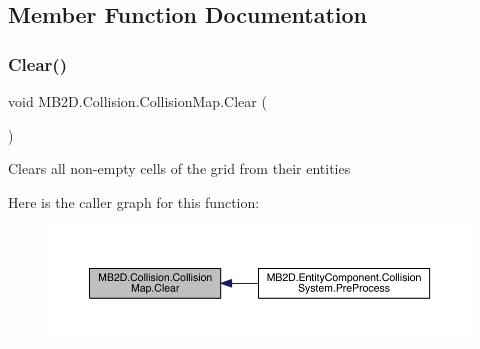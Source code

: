 \subsection{Member Function Documentation}
\hypertarget{class_m_b2_d_1_1_collision_1_1_collision_map_ac7eeef6db2deadf738ea40ff939759ff}{}\label{class_m_b2_d_1_1_collision_1_1_collision_map_ac7eeef6db2deadf738ea40ff939759ff} 
\subsubsection{\texorpdfstring{Clear()}{Clear()}}
{\footnotesize\ttfamily void M\+B2\+D.\+Collision.\+Collision\+Map.\+Clear (\begin{DoxyParamCaption}{ }\end{DoxyParamCaption})\hspace{0.3cm}{\ttfamily [inline]}}



Clears all non-\/empty cells of the grid from their entities 

Here is the caller graph for this function\+:\nopagebreak
\begin{figure}[H]
\begin{center}
\leavevmode
\includegraphics[width=350pt]{class_m_b2_d_1_1_collision_1_1_collision_map_ac7eeef6db2deadf738ea40ff939759ff_icgraph}
\end{center}
\end{figure}
\hypertarget{class_m_b2_d_1_1_collision_1_1_collision_map_acbc6d9d9bb85342cf8f07c22f6947b27}{}\label{class_m_b2_d_1_1_collision_1_1_collision_map_acbc6d9d9bb85342cf8f07c22f6947b27} 
